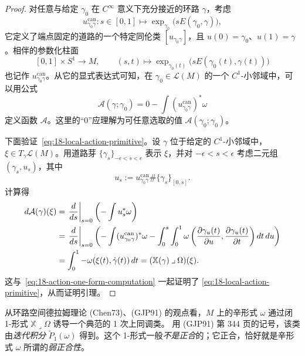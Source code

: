 \begin{proof}
对任意与给定 $\gamma_0$ 在 $C^\infty$ 意义下充分接近的环路 $\gamma$，考虑
\[
 u^{\mathrm{can}}_{\gamma_0\gamma}:s\in[0,1]
 \longmapsto\exp_{\gamma_0}\bigl(sE(\gamma_0,\gamma)\bigr),
\]
它定义了端点固定的道路的一个特定同伦类
$[u_{\gamma_0\gamma}]$，且 $u(0)=\gamma_0$、$u(1)=\gamma$。相伴的参数化柱面
\[
 [0,1]\times S^1\longrightarrow M,\qquad
 (s,t)\longmapsto\exp_{\gamma_0(t)}\bigl(sE(\gamma_0(t),\gamma(t))\bigr)
\]
也记作 $u^{\mathrm{can}}_{\gamma_0\gamma}$。从它的显式表达式可知，在
$\gamma_0\in\mathcal L(M)$ 的一个 $C^1$-小邻域中，可以用公式
\begin{equation}
 \mathcal A(\gamma;\gamma_0)=0-\int
   (u^{\mathrm{can}}_{\gamma_0\gamma})^*\omega
 \label{eq:18-local-action-function}
\end{equation}
定义函数 $\mathcal A$。这里的“$0$”应理解为可任意选取的值
$\mathcal A(\gamma_0;\gamma_0)$。

下面验证~\eqref{eq:18-local-action-primitive}。设 $\gamma$ 位于给定的
$C^1$-小邻域中，$\xi\in T_\gamma\mathcal L(M)$。用道路芽
$\{\gamma_s\}_{-\epsilon<s<\epsilon}$ 表示 $\xi$，并对
$-\epsilon<s<\epsilon$ 考虑二元组 $(\gamma_s,u_s)$，其中
\[
 u_s:=u^{\mathrm{can}}_{\gamma_0\gamma}\#\{\gamma_s\}_{[0,s]}.
\]
计算得
\begin{align}
 d\mathcal A(\gamma)(\xi)
 &=\left.\frac d{ds}\right|_{s=0}\left(-\int u_s^*\omega\right)\notag\\
 &=\left.\frac d{ds}\right|_{s=0}\left(
   -\int (u^{\mathrm{can}}_{\gamma_0\gamma})^*\omega
   -\int_0^s\int_0^1
   \omega\left(\frac{\partial\gamma_u(t)}{\partial u},
                \frac{\partial\gamma_u(t)}{\partial t}\right)dt\,du
   \right)\notag\\
 &=\int_0^1-\omega(\xi(t),\dot\gamma(t))\,dt
  =(\mathbb X(\gamma)\mathbin{\lrcorner}\Omega)(\xi).
 \label{eq:18-action-one-form-computation}
\end{align}
这与~\eqref{eq:18-action-one-form-computation} 一起证明了
\eqref{eq:18-local-action-primitive}，从而证明引理。
\end{proof}

\begin{remark}
\label{rem:18-loop-space-de-rham-class}
从环路空间德拉姆理论 (Chen73)、(GJP91) 的观点看，$M$ 上的辛形式 $\omega$
通过闭 1-形式 $\mathbb X\mathbin{\lrcorner}\Omega$ 诱导一个典范的 1 次上同调类。
用 (GJP91) 第 344 页的记号，该类由\emph{迭代积分} $\widetilde P_1(\omega)$ 得到。这个
1-形式一般\emph{不是正合}的；它正合，恰好就是辛形式 $\omega$ 所谓的\emph{弱正合性}。
\end{remark}

